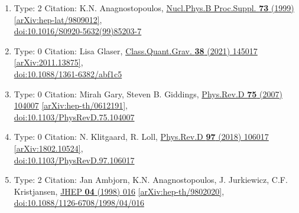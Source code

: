 \documentclass[a4paper,10pt]{article}
\begin{document}
\begin{enumerate}
\begin{enumerate}
  \item Type: 2 Citation: K.N. Anagnostopoulos, \href{https://www.doi.org/10.1016/S0920-5632(99)85203-7}{Nucl.Phys.B Proc.Suppl. {\bf 73} (1999) }  \href{https://arxiv.org/abs/hep-lat/9809012}{[arXiv:hep-lat/9809012]},\\\href{https://www.doi.org/10.1016/S0920-5632(99)85203-7}{doi:10.1016/S0920-5632(99)85203-7}
  \item Type: 0 Citation: Lisa Glaser, \href{https://www.doi.org/10.1088/1361-6382/abf1c5}{Class.Quant.Grav. {\bf 38} (2021) 145017}  \href{https://arxiv.org/abs/2011.13875}{[arXiv:2011.13875]},\\\href{https://www.doi.org/10.1088/1361-6382/abf1c5}{doi:10.1088/1361-6382/abf1c5}
  \item Type: 0 Citation: Mirah Gary, Steven B. Giddings, \href{https://www.doi.org/10.1103/PhysRevD.75.104007}{Phys.Rev.D {\bf 75} (2007) 104007}  \href{https://arxiv.org/abs/hep-th/0612191}{[arXiv:hep-th/0612191]},\\\href{https://www.doi.org/10.1103/PhysRevD.75.104007}{doi:10.1103/PhysRevD.75.104007}
  \item Type: 0 Citation: N. Klitgaard, R. Loll, \href{https://www.doi.org/10.1103/PhysRevD.97.106017}{Phys.Rev.D {\bf 97} (2018) 106017}  \href{https://arxiv.org/abs/1802.10524}{[arXiv:1802.10524]},\\\href{https://www.doi.org/10.1103/PhysRevD.97.106017}{doi:10.1103/PhysRevD.97.106017}
  \item Type: 2 Citation: Jan Ambjorn, K.N. Anagnostopoulos, J. Jurkiewicz, C.F. Kristjansen, \href{https://www.doi.org/10.1088/1126-6708/1998/04/016}{JHEP {\bf 04} (1998) 016}  \href{https://arxiv.org/abs/hep-th/9802020}{[arXiv:hep-th/9802020]},\\\href{https://www.doi.org/10.1088/1126-6708/1998/04/016}{doi:10.1088/1126-6708/1998/04/016}

\end{enumerate}
\end{enumerate}
\end{document}
